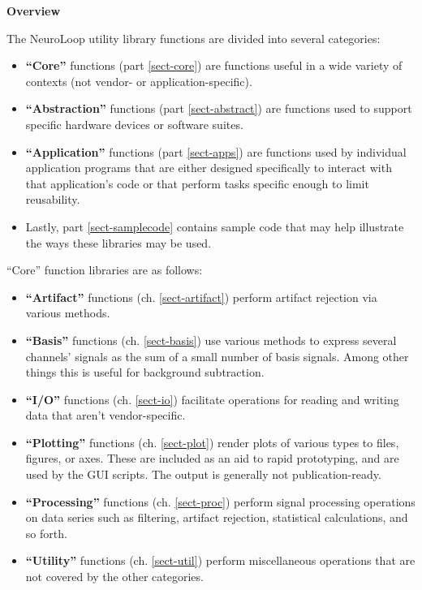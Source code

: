 
\vspace*{0.75in}
{\Huge \bfseries Overview}
\vspace*{\baselineskip}
\label{sect-over}

The NeuroLoop utility library functions are divided into several categories:

\begin{itemize}
%
\item \textbf{``Core''} functions (part \ref{sect-core}) are functions
useful in a wide variety of contexts (not vendor- or application-specific).
%
\item \textbf{``Abstraction''} functions (part \ref{sect-abstract}) are
functions used to support specific hardware devices or software suites.
%
\item \textbf{``Application''} functions (part \ref{sect-apps}) are
functions used by individual application programs that are either designed
specifically to interact with that application's code or that perform
tasks specific enough to limit reusability.
%
\item Lastly, part \ref{sect-samplecode} contains sample code that may
help illustrate the ways these libraries may be used.
%
\end{itemize}

``Core'' function libraries are as follows:

\begin{itemize}
%
\item \textbf{``Artifact''} functions (ch. \ref{sect-artifact}) perform
artifact rejection via various methods.
%
\item \textbf{``Basis''} functions (ch. \ref{sect-basis}) use various
methods to express several channels' signals as the sum of a small number
of basis signals. Among other things this is useful for background
subtraction.
%
\item \textbf{``I/O''} functions (ch. \ref{sect-io}) facilitate operations
for reading and writing data that aren't vendor-specific.
%
\item \textbf{``Plotting''} functions (ch. \ref{sect-plot}) render plots
of various types to files, figures, or axes. These are included as an aid
to rapid prototyping, and are used by the GUI scripts. The output is
generally not publication-ready.
%
\item \textbf{``Processing''} functions (ch. \ref{sect-proc}) perform signal
processing operations on data series such as filtering, artifact rejection,
statistical calculations, and so forth.
%
\item \textbf{``Utility''} functions (ch. \ref{sect-util}) perform
miscellaneous operations that are not covered by the other categories.
%
\end{itemize}

